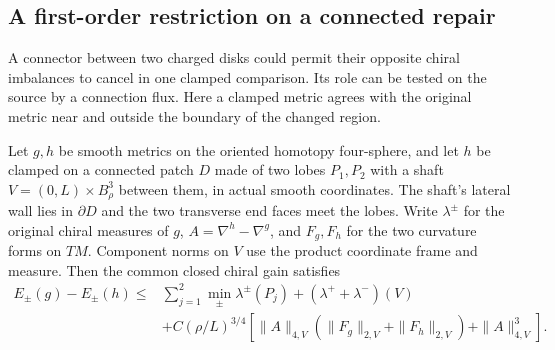 \subsection{A first-order restriction on a connected repair}
\label{sec:connected-repair}

A connector between two charged disks could permit their opposite
chiral imbalances to cancel in one clamped comparison. Its role can
be tested on the source by a connection flux. Here a clamped
metric agrees with the original metric near and outside the
boundary of the changed region.

\begin{proposition}
\label{prop:chiral-tube-transfer}
Let \(g,h\) be smooth metrics on the oriented homotopy four-sphere,
and let \(h\) be clamped on a connected patch \(D\) made of two lobes
\(P_1,P_2\) with a shaft \(V=(0,L)\times B_\rho^3\) between them, in
actual smooth coordinates. The shaft's lateral wall lies in
\(\partial D\) and the two transverse end faces meet the lobes.
Write \(\lambda^\pm\) for the original chiral measures of \(g\),
\(A=\nabla^h-\nabla^g\), and \(F_g,F_h\) for the two curvature
forms on \(TM\). Component norms on \(V\) use the product coordinate
frame and measure. Then the common closed chiral gain satisfies
\begin{equation}\label{eq:chiral-tube-transfer}
\begin{split}
 E_\pm(g)-E_\pm(h)\le {}&
 \sum_{j=1}^2\min_\pm\lambda^\pm(P_j)
     +(\lambda^++\lambda^-)(V) \\
 &+C(\rho/L)^{3/4}
  \left[\|A\|_{4,V}(\|F_g\|_{2,V}+\|F_h\|_{2,V})
                      +\|A\|_{4,V}^3\right].
\end{split}
\end{equation}
\end{proposition}

